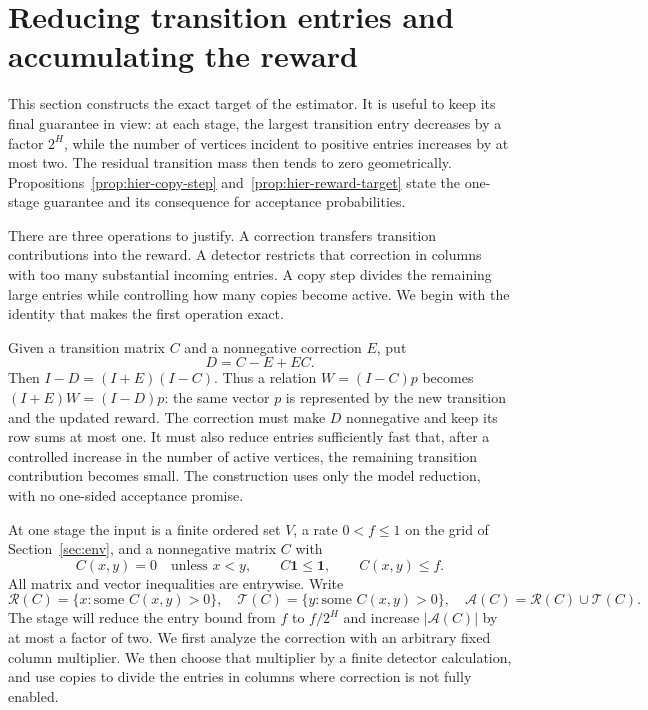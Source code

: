 \section{Reducing transition entries and accumulating the reward}
\label{sec:hierarchy}

This section constructs the exact target of the estimator. It is useful to keep its final guarantee in view: at each stage, the largest transition entry decreases by a factor $2^H$, while the number of vertices incident to positive entries increases by at most two. The residual transition mass then tends to zero geometrically. Propositions~\ref{prop:hier-copy-step} and~\ref{prop:hier-reward-target} state the one-stage guarantee and its consequence for acceptance probabilities.

There are three operations to justify. A correction transfers transition contributions into the reward. A detector restricts that correction in columns with too many substantial incoming entries. A copy step divides the remaining large entries while controlling how many copies become active. We begin with the identity that makes the first operation exact.

Given a transition matrix $C$ and a nonnegative correction $E$, put
\[
 D=C-E+EC.
\]
Then $I-D=(I+E)(I-C)$. Thus a relation $W=(I-C)p$ becomes
$(I+E)W=(I-D)p$: the same vector $p$ is represented by the new transition
and the updated reward. The correction must make $D$ nonnegative and keep
its row sums at most one. It must also reduce entries sufficiently fast
that, after a controlled increase in the number of active vertices, the
remaining transition contribution becomes small.  The construction uses
only the model reduction, with no one-sided acceptance promise.

At one stage the input is a finite ordered set $V$, a rate $0<f\le1$
on the grid of Section~\ref{sec:env}, and a nonnegative matrix $C$ with
\begin{equation}
 C(x,y)=0\quad\text{unless }x<y,\qquad
 C\mathbf1\le\mathbf1,\qquad C(x,y)\le f.
 \label{eq:hier-input}
\end{equation}
All matrix and vector inequalities are entrywise. Write
\[
 \mathcal R(C)=\{x:\text{some }C(x,y)>0\},\quad
 \mathcal T(C)=\{y:\text{some }C(x,y)>0\},\quad
 \mathcal A(C)=\mathcal R(C)\cup\mathcal T(C).
\]
The stage will reduce the entry bound from $f$ to $f/2^H$ and increase
$|\mathcal A(C)|$ by at most a factor of two. We first analyze the
correction with an arbitrary fixed column multiplier. We then choose that
multiplier by a finite detector calculation, and use copies to divide the
entries in columns where correction is not fully enabled.

